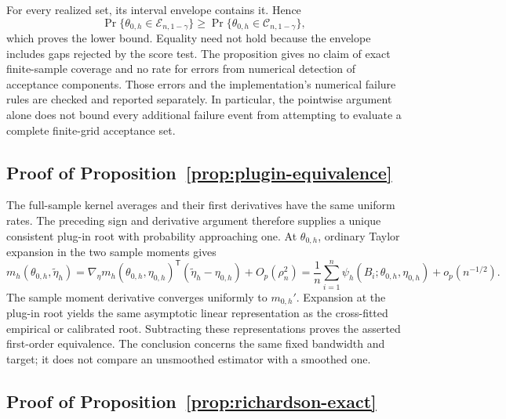 For every realized set, its interval envelope contains it. Hence
\[
\Pr\{\theta_{0,h}\in\mathcal E_{n,1-\gamma}\}
\geq
\Pr\{\theta_{0,h}\in\mathcal C_{n,1-\gamma}\},
\]
which proves the lower bound. Equality need not hold because the envelope
includes gaps rejected by the score test. The proposition gives no claim of
exact finite-sample coverage and no rate for errors from numerical detection
of acceptance components. Those errors and the implementation's numerical
failure rules are checked and reported separately. In particular, the
pointwise argument alone does not bound every additional failure event from
attempting to evaluate a complete finite-grid acceptance set.

\subsection{Proof of Proposition~\ref{prop:plugin-equivalence}}

The full-sample kernel averages and their first derivatives have the same
uniform rates. The preceding sign and derivative argument therefore supplies
a unique consistent plug-in root with probability approaching one. At
$\theta_{0,h}$, ordinary Taylor expansion in the two sample moments gives
\begin{equation}
m_h(\theta_{0,h},\widetilde\eta_h)
=\nabla_\eta m_h(\theta_{0,h},\eta_{0,h})^{\mathsf T}
(\widetilde\eta_h-\eta_{0,h})+O_p(\rho_n^2)
=\frac1n\sum_{i=1}^n\psi_h(B_i;\theta_{0,h},\eta_{0,h})
+o_p(n^{-1/2}).
\end{equation}
The sample moment derivative converges uniformly to $m_{0,h}'$. Expansion at
the plug-in root yields the same asymptotic linear representation as the
cross-fitted empirical or calibrated root. Subtracting these representations
proves the asserted first-order equivalence. The conclusion concerns the
same fixed bandwidth and target; it does not compare an unsmoothed estimator
with a smoothed one.

\subsection{Proof of Proposition~\ref{prop:richardson-exact}}

